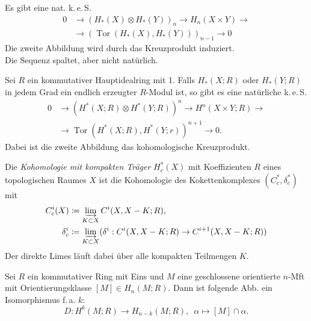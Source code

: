 \documentclass{cheat-sheet}
\DeclareMathOperator{\Tor}{Tor}
\newcommand{\keS}{k.\,e.\,S.} %
\begin{document}
\begin{satz}
  Es gibt eine nat. \keS{}
  \begin{align*}
    0 & \to (H_*(X) \otimes H_*(Y))_n \to H_n(X \times Y) \to \\
    & \to (\Tor(H_*(X), H_*(Y)))_{n-1} \to 0
  \end{align*}
  Die zweite Abbildung wird durch das Kreuzprodukt induziert. \\
  Die Sequenz spaltet, aber nicht natürlich.
\end{satz}

\begin{satz}
  Sei $R$ ein kommutativer Hauptidealring mit 1. Falls $H_*(X; R)$ oder $H_*(Y; R)$ in jedem Grad ein endlich erzeugter $R$-Modul ist, so gibt es eine natürliche \keS{}
  \begin{align*}
     0 & \to (H^*(X; R) \otimes H^*(Y; R))^n \to H^n(X \times Y; R) \to \\
     & \to \Tor(H^*(X; R), H^*(Y; r))^{n+1} \to 0.
  \end{align*}
  Dabei ist die zweite Abbildung das kohomologische Kreuzprodukt.
\end{satz}


\begin{defn}
  Die \emph{Kohomologie mit kompakten Träger} $H_c^*(X)$ mit Koeffizienten $R$ eines topologischen Raumes $X$ ist die Kohomologie des Kokettenkomplexes $(C_c^*, \delta_c^*)$ mit
  \begin{align*}
    C_c^i(X) & \coloneqq \varinjlim_{K \subset X} C^i(X, X - K; R), \\
    \delta_c^i & \coloneqq \varinjlim_{K \subset X} (\delta^i : C^i(X, X - K; R) \to C^{i+1}(X, X - K; R))
  \end{align*}
  Der direkte Limes läuft dabei über alle kompakten Teilmengen $K$.
\end{defn}

\begin{satz}
  Sei $R$ ein kommutativer Ring mit Eins und $M$ eine geschlossene orientierte $n$-Mft mit Orientierungsklasse $[M] \in H_n(M; R)$. Dann ist folgende Abb. ein Isomorphismus f.\,a. $k$:
  \[ D : H^k(M; R) \to H_{n-k}(M; R), \enspace \alpha \mapsto [M] \cap \alpha. \]
\end{satz}
\end{document}
